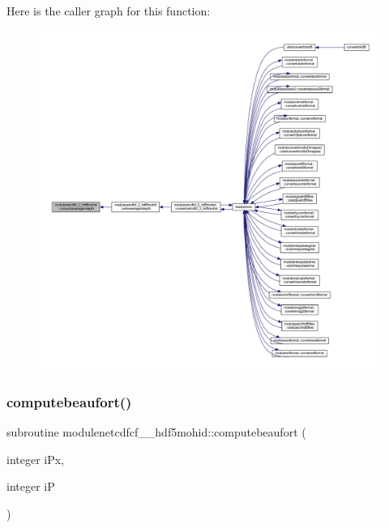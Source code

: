 Here is the caller graph for this function\+:\nopagebreak
\begin{figure}[H]
\begin{center}
\leavevmode
\includegraphics[width=350pt]{namespacemodulenetcdfcf__2__hdf5mohid_ad68e046fa00afcf9001262e40ce56492_icgraph}
\end{center}
\end{figure}
\mbox{\label{namespacemodulenetcdfcf__2__hdf5mohid_a342a5907548f35cf4975a0ffd50c9a3c}} 
\subsubsection{\texorpdfstring{computebeaufort()}{computebeaufort()}}
{\footnotesize\ttfamily subroutine modulenetcdfcf\+\_\+\_\+hdf5mohid\+::computebeaufort (\begin{DoxyParamCaption}\item[{integer}]{i\+Px,  }\item[{integer}]{iP }\end{DoxyParamCaption})\hspace{0.3cm}{\ttfamily [private]}}

